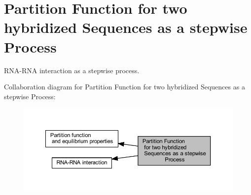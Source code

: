 \hypertarget{group__up__cofold}{}\section{Partition Function for two hybridized Sequences as a stepwise Process}
\label{group__up__cofold}


R\+N\+A-\/\+R\+NA interaction as a stepwise process.  


Collaboration diagram for Partition Function for two hybridized Sequences as a stepwise Process\+:
\nopagebreak
\begin{figure}[H]
\begin{center}
\leavevmode
\includegraphics[width=350pt]{group__up__cofold}
\end{center}
\end{figure}
